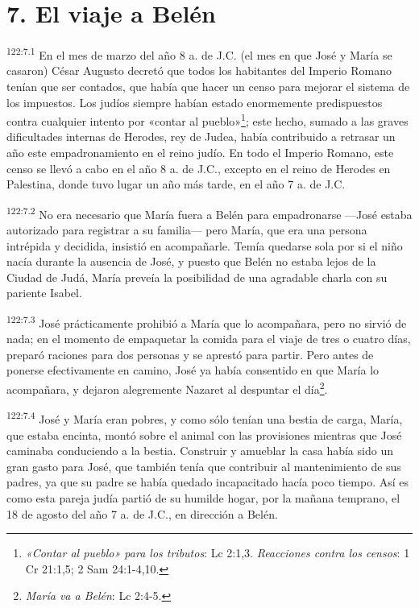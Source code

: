\section*{7. El viaje a Belén}
\par
\textsuperscript{122:7.1} En el mes de marzo del año 8 a. de J.C. (el mes en que José y María se casaron) César Augusto decretó que todos los habitantes del Imperio Romano tenían que ser contados, que había que hacer un censo para mejorar el sistema de los impuestos. Los judíos siempre habían estado enormemente predispuestos contra cualquier intento por «contar al pueblo»\footnote{\textit{«Contar al pueblo» para los tributos}: Lc 2:1,3. \textit{Reacciones contra los censos}: 1 Cr 21:1,5; 2 Sam 24:1-4,10.}; este hecho, sumado a las graves dificultades internas de Herodes, rey de Judea, había contribuido a retrasar un año este empadronamiento en el reino judío. En todo el Imperio Romano, este censo se llevó a cabo en el año 8 a. de J.C., excepto en el reino de Herodes en Palestina, donde tuvo lugar un año más tarde, en el año 7 a. de J.C.

\par
\textsuperscript{122:7.2} No era necesario que María fuera a Belén para empadronarse ---José estaba autorizado para registrar a su familia--- pero María, que era una persona intrépida y decidida, insistió en acompañarle. Temía quedarse sola por si el niño nacía durante la ausencia de José, y puesto que Belén no estaba lejos de la Ciudad de Judá, María preveía la posibilidad de una agradable charla con su pariente Isabel.

\par
\textsuperscript{122:7.3} José prácticamente prohibió a María que lo acompañara, pero no sirvió de nada; en el momento de empaquetar la comida para el viaje de tres o cuatro días, preparó raciones para dos personas y se aprestó para partir. Pero antes de ponerse efectivamente en camino, José ya había consentido en que María lo acompañara, y dejaron alegremente Nazaret al despuntar el día\footnote{\textit{María va a Belén}: Lc 2:4-5.}.

\par
\textsuperscript{122:7.4} José y María eran pobres, y como sólo tenían una bestia de carga, María, que estaba encinta, montó sobre el animal con las provisiones mientras que José caminaba conduciendo a la bestia. Construir y amueblar la casa había sido un gran gasto para José, que también tenía que contribuir al mantenimiento de sus padres, ya que su padre se había quedado incapacitado hacía poco tiempo. Así es como esta pareja judía partió de su humilde hogar, por la mañana temprano, el 18 de agosto del año 7 a. de J.C., en dirección a Belén.

